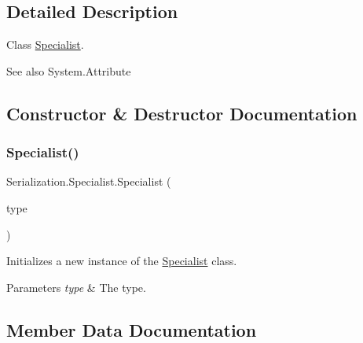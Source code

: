 \subsection{Detailed Description}
Class \hyperlink{class_serialization_1_1_specialist}{Specialist}. 

\begin{DoxySeeAlso}{See also}
System.\+Attribute


\end{DoxySeeAlso}


\subsection{Constructor \& Destructor Documentation}
\mbox{\label{class_serialization_1_1_specialist_af1f9433f221cfd4490f5d30f4045e06f}} 
\subsubsection{\texorpdfstring{Specialist()}{Specialist()}}
{\footnotesize\ttfamily Serialization.\+Specialist.\+Specialist (\begin{DoxyParamCaption}\item[{\hyperlink{class_serialization_1_1_specialist_aa9b0e99569f13034ea86bfb104c79be3}{Type}}]{type }\end{DoxyParamCaption})\hspace{0.3cm}{\ttfamily [inline]}}



Initializes a new instance of the \hyperlink{class_serialization_1_1_specialist}{Specialist} class. 


\begin{DoxyParams}{Parameters}
{\em type} & The type.\\
\hline
\end{DoxyParams}


\subsection{Member Data Documentation}
\mbox{\label{class_serialization_1_1_specialist_aa9b0e99569f13034ea86bfb104c79be3}} 

